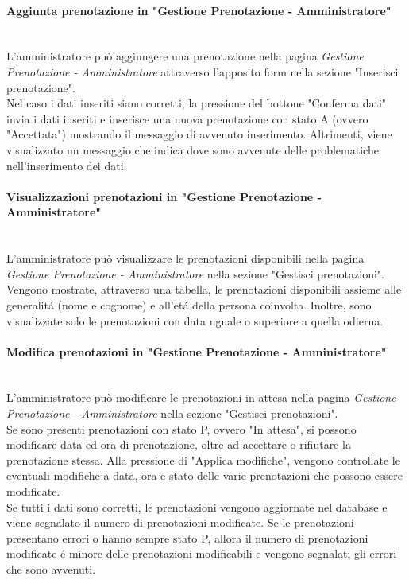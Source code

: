 \documentclass[]{article}
\begin{document}
\paragraph{Aggiunta prenotazione in "Gestione Prenotazione - Amministratore"}\mbox{}\\
L'amministratore può aggiungere una prenotazione nella pagina \textit{Gestione Prenotazione - Amministratore} attraverso l'apposito form nella sezione "Inserisci prenotazione".\\
Nel caso i dati inseriti siano corretti, la pressione del bottone "Conferma dati" invia i dati inseriti e inserisce una nuova prenotazione con stato A (ovvero "Accettata") mostrando il messaggio di avvenuto inserimento. Altrimenti, viene visualizzato un messaggio che indica dove sono avvenute delle problematiche nell'inserimento dei dati.

\paragraph{Visualizzazioni prenotazioni in "Gestione Prenotazione - Amministratore"}\mbox{}\\
L'amministratore può visualizzare le prenotazioni disponibili nella pagina \textit{Gestione Prenotazione - Amministratore} nella sezione "Gestisci prenotazioni".\\
Vengono mostrate, attraverso una tabella, le prenotazioni disponibili assieme alle generalitá (nome e cognome) e all'etá della persona coinvolta. Inoltre, sono visualizzate solo le prenotazioni con data uguale o superiore a quella odierna.

\paragraph{Modifica prenotazioni in "Gestione Prenotazione - Amministratore"}\mbox{}\\
L'amministratore può modificare le prenotazioni in attesa nella pagina \textit{Gestione Prenotazione - Amministratore} nella sezione "Gestisci prenotazioni".\\
Se sono presenti prenotazioni con stato P, ovvero "In attesa", si possono modificare data ed ora di prenotazione, oltre ad accettare o rifiutare la prenotazione stessa. Alla pressione di "Applica modifiche", vengono controllate le eventuali modifiche a data, ora e stato delle varie prenotazioni che possono essere modificate.\\
Se tutti i dati sono corretti, le prenotazioni vengono aggiornate nel database e viene segnalato il numero di prenotazioni modificate. Se le prenotazioni presentano errori o hanno sempre stato P, allora il numero di prenotazioni modificate é minore delle prenotazioni modificabili e vengono segnalati gli errori che sono avvenuti.
\end{document}
